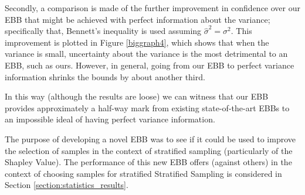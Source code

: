 Secondly, a comparison is made of the further improvement in confidence over our EBB that might be achieved with perfect information about the variance; specifically that, Bennett's inequality is used assuming $\hat{\sigma}^2=\sigma^2$. 
This improvement is plotted in Figure \ref{biggraph4}, which shows that when the variance is small, uncertainty about the variance is the most detrimental to an EBB, such as ours.
However, in general, going from our EBB to perfect variance information shrinks the bounds by about another third.

In this way (although the results are loose) we can witness that our EBB provides approximately a half-way mark from existing state-of-the-art EBBs to an impossible ideal of having perfect variance information.

The purpose of developing a novel EBB was to see if it could be used to improve the selection of samples in the context of stratified sampling (particularly of the Shapley Value).
The performance of this new EBB offers (against others) in the context of choosing samples for stratified Stratified Sampling is considered in Section \ref{section:statistics_results}.


%



